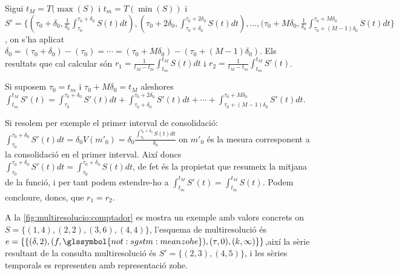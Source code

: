 \begin{example}
\begin{itemize}
    Sigui $t_M=T(\max(S)$ i $t_m=T(\min(S))$ i $S'= \{
    (\tau_0+\delta_0, \frac{1}{\delta_0}
    \int_{\tau_0}^{\tau_0+\delta_0} S(t) dt), (\tau_0+2\delta_0,
    \int_{\tau_0+\delta_0}^{\tau_0+2\delta_0} S(t) dt), \dotsc,
    (\tau_0+M\delta_0, \frac{1}{\delta_0}
    \int_{\tau_0+(M-1)\delta_0}^{\tau_0+M\delta_0} S(t) dt \}$, on
    s'ha aplicat $\delta_0= (\tau_0+\delta_0)-(\tau_0)=\dotsb=
    (\tau_0+M\delta_0)-(\tau_0+(M-1)\delta_0)$.  Els resultats que cal
    calcular són $r_1=\frac{1}{t_M-t_m} \int_{t_m}^{t_M} S(t)dt$ i
    $r_2 = \frac{1}{t_M-t_m} \int_{t_m}^{t_M} S'(t)$.

    Si suposem $\tau_0=t_m$ i $\tau_0+M\delta_0=t_M$ aleshores
    $\int_{t_m}^{t_M} S'(t) = \int_{\tau_0}^{\tau_0+\delta_0} S'(t) dt + \int_{\tau_0+\delta_0}^{\tau_0+2\delta_0} S'(t) dt + \dotsb + \int_{\tau_0+(M-1)\delta_0}^{\tau_0+M\delta_0}
    S'(t) dt$.  
    
    Si resolem per exemple el primer interval de consolidació: $
    \int_{\tau_0}^{\tau_0+\delta_0} S'(t) dt = \delta_0V(m'_0) =
    \delta_0 \frac{ \int_{\tau_0}^{\tau_0+\delta_0} S(t)
      dt}{\delta_0}$ on $m'_0$ és la mesura corresponent a la
    consolidació en el primer interval. Així doncs
    $\int_{\tau_0}^{\tau_0+\delta_0} S'(t) dt =
    \int_{\tau_0}^{\tau_0+\delta_0} S(t) dt$, de fet és la propietat
    que resumeix la mitjana de la funció, i per tant podem estendre-ho
    a $\int_{t_m}^{t_M} S'(t)= \int_{t_m}^{t_M} S(t)$. Podem
    concloure, doncs, que $r_1=r_2$.


    A la \autoref{fig:multiresolucio:comptador} es mostra un exemple
    amb valors concrets on $S=\{ (1,4),(2,2),(3,6),(4,4)\}$, l'esquema
    de multiresolució és
    $e=\{\{(\delta,2),(f,\glssymbol{not:sgstm:meanzohe}),(\tau,0),(k,\infty)\}
    \}$,així la sèrie resultant de la consulta multiresolució
    és $S'=\{ (2,3),(4,5)\}$, i les sèries temporals es representen amb
    representació \gls{zohe}.


\begin{figure}[tp]
  \centering


\end{figure}
\end{itemize}
\end{example}

